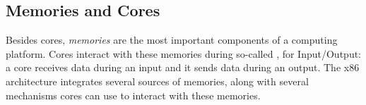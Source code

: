 %

\subsection{Memories and Cores \IOs}
\label{subsec:usecase:mem}
%
Besides cores, \emph{memories} are the most important components of a computing
platform.
%
Cores interact with these memories during so-called \IOs, for Input/Output: a
core receives data during an input and it sends data during an output.
%
The x86 architecture integrates several sources of memories, along with several
mechanisms cores can use to interact with these memories.

